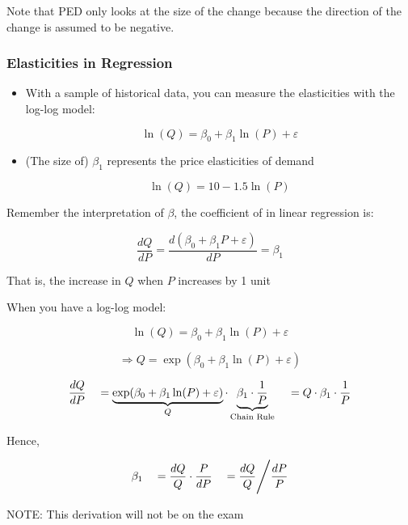 \documentclass[10pt,article]{article}
\begin{document}
\begin{mdframed}[frametitle={Note}]
Note that PED only looks at the size of the change because the direction of
the change is assumed to be negative.
\end{mdframed}

\subsubsection{Elasticities in Regression}
\label{sec:orgfa1da13}
\begin{itemize}
\item With a sample of historical data, you can measure the elasticities with the
log-log model:

\[ \ln(Q) = \beta_0 + \beta_1 \ln(P) + \varepsilon \]

\item (The size of) \(\beta_1\) represents the price elasticities of demand

\[ \ln(Q) = 10 -1.5 \ln(P) \]
\end{itemize}

\iffalse
\begin{itemize}
\item Derivation on the class notes
\end{itemize}
\fi

\begin{mdframed}[frametitle={Why?}]
Remember the interpretation of \(\beta\), the
coefficient of in linear regression is:

\[ 
   \dfrac{d Q}{d P} = \dfrac{d (\beta_0 + \beta_1 P +
   \varepsilon) }{d P} = \beta_1
\]

That is, the increase in \(Q\)  when \(P\)  increases by 1 unit

When you have a log-log model:

\[ \ln(Q) = \beta_0 + \beta_1 \ln (P) + \varepsilon\]

\[ \Rightarrow Q = \exp(\beta_0 + \beta_1 \ln (P) + \varepsilon ) \]

\[ \dfrac{d Q}{d P}  \quad = \underbrace{\exp(\beta_0 + \beta_1 \ln(P) +
          \varepsilon )}_{Q}
         \cdot \underbrace{\beta_1 \cdot \dfrac{1}{P}}_{\text{Chain Rule}} \\
           \quad =  Q \cdot \beta_1 \cdot \dfrac{1}{P} 
\]

\iffalse
\[    \dfrac{d Q}{d P}  = Q \cdot \beta_1 \cdot \dfrac{1}{P} \]
\fi

Hence,

\[       \beta_1 \quad = \dfrac{d Q}{Q} \cdot \dfrac{P}{d P} \\
                 \quad = \dfrac{d Q}{Q} \Bigg/ \dfrac{d P}{P} \]


NOTE: This derivation will not be on the exam
\end{mdframed}
\end{document}
